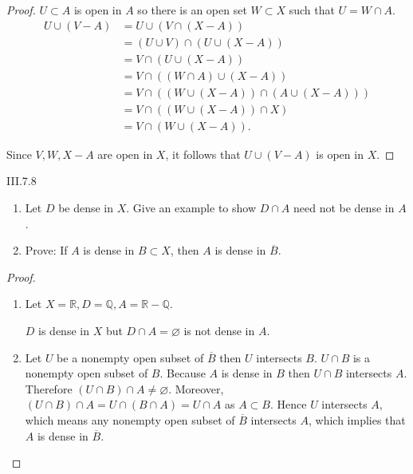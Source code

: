\begin{proof}
	\( U \subset A \) is open in \(A\) so there is an open set \( W \subset X \) such that \( U = W \cap A \).
	\begingroup
	\allowdisplaybreaks%
	\begin{align*}
		U \cup (V - A) & = U \cup (V \cap (X - A))                         \\
		               & = (U \cup V) \cap (U \cup (X - A))                \\
		               & = V \cap (U \cup (X - A))                         \\
		               & = V \cap ((W \cap A) \cup (X - A))                \\
		               & = V \cap ((W \cup (X - A)) \cap (A \cup (X - A))) \\
		               & = V \cap ((W \cup (X - A)) \cap X)                \\
		               & = V \cap (W \cup (X - A)).
	\end{align*}
	\endgroup

	Since \( V, W, X - A \) are open in \( X \), it follows that \( U \cup (V - A) \) is open in \( X \).
\end{proof}

\begin{problem}{III.7.8}
\begin{enumerate}[label={(\alph*)}]
	\item Let \(D\) be dense in \(X\). Give an example to show \( D \cap A \) need not be dense in \(A\).
	\item Prove: If \(A\) is dense in \(B \subset X\), then \(A\) is dense in \( \overline{B} \).
\end{enumerate}
\end{problem}

\begin{proof}
	\begin{enumerate}[label={(\alph*)}]
		\item Let \( X = \mathbb{R}, D = \mathbb{Q}, A = \mathbb{R} - \mathbb{Q} \).

		      \( D \) is dense in \(X\) but \( D \cap A = \varnothing \) is not dense in \( A \).
		\item Let \( U \) be a nonempty open subset of \( \overline{B} \) then \( U \) intersects \( B \). \( U \cap B \) is a nonempty open subset of \( B \). Because \( A \) is dense in \( B \) then \( U \cap B \) intersects \( A \). Therefore \( (U \cap B) \cap A \ne \varnothing \). Moreover, \( (U \cap B) \cap A = U \cap (B \cap A) = U \cap A \) as \( A \subset B \). Hence \( U \) intersects \( A \), which means any nonempty open subset of \( \overline{B} \) intersects \( A \), which implies that \( A \) is dense in \( \overline{B} \).
	\end{enumerate}
\end{proof}

